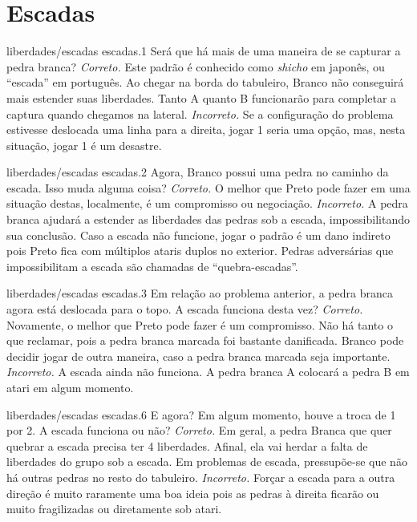 \chapter{Escadas}

\emptypage

\problemAnswerDiagram
  {liberdades/escadas}
  {escadas.1}
  {Será que há mais de uma maneira de se capturar a pedra branca?}
  {\emph{Correto.} Este padrão é conhecido como \emph{shicho} em japonês, ou ``escada'' em português. Ao chegar na borda do tabuleiro, Branco não conseguirá mais estender suas liberdades. Tanto A quanto B funcionarão para completar a captura quando chegamos na lateral.}
  {\emph{Incorreto.} Se a configuração do problema estivesse deslocada uma linha para a direita, jogar 1 seria uma opção, mas, nesta situação, jogar 1 é um desastre.}

\problemAnswerDiagram
  {liberdades/escadas}
  {escadas.2}
  {Agora, Branco possui uma pedra no caminho da escada. Isso muda alguma coisa?}
  {\emph{Correto.} O melhor que Preto pode fazer em uma situação destas, localmente, é um compromisso ou negociação.}
  {\emph{Incorreto.} A pedra branca ajudará a estender as liberdades das pedras sob a escada, impossibilitando sua conclusão. Caso a escada não funcione, jogar o padrão é um dano indireto pois Preto fica com múltiplos ataris duplos no exterior. Pedras adversárias que impossibilitam a escada são chamadas de ``quebra-escadas''.}

\problemAnswerDiagram
  {liberdades/escadas}
  {escadas.3}
  {Em relação ao problema anterior, a pedra branca agora está deslocada para o topo. A escada funciona desta vez?}
  {\emph{Correto.} Novamente, o melhor que Preto pode fazer é um compromisso. Não há tanto o que reclamar, pois a pedra branca marcada foi bastante danificada. Branco pode decidir jogar de outra maneira, caso a pedra branca marcada seja importante.}
  {\emph{Incorreto.} A escada ainda não funciona. A pedra branca A colocará a pedra B em atari em algum momento.}

\problemAnswerDiagram
  {liberdades/escadas}
  {escadas.6}
  {E agora? Em algum momento, houve a troca de 1 por 2. A escada funciona ou não?}
  {\emph{Correto.} Em geral, a pedra Branca que quer quebrar a escada precisa ter 4 liberdades. Afinal, ela vai herdar a falta de liberdades do grupo sob a escada. Em problemas de escada, pressupõe-se que não há outras pedras no resto do tabuleiro.}
  {\emph{Incorreto.} Forçar a escada para a outra direção é muito raramente uma boa ideia pois as pedras à direita ficarão ou muito fragilizadas ou diretamente sob atari.}

